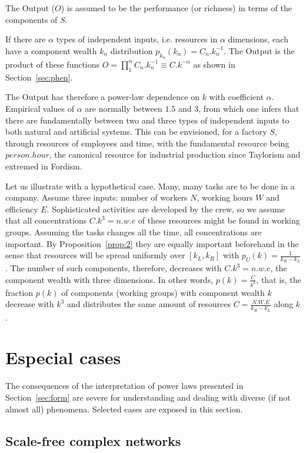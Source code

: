 \documentclass[a4paper, 11pt]{article} %
\begin{document}
The Output ($O$)
is assumed to be the performance (or richness) in terms of the components of $S$.

If there are $\alpha$ types of independent inputs, i.e. resources in $\alpha$ dimensions,
each have a component wealth $k_n$ distribution
$p_{k_n}(k_n)=C_n.k_n^{-1}$.
The Output is the product of these functions
$O = \prod_1^{\alpha} C_n.k_n^{-1}\equiv C.k^{-\alpha}$
as shown in Section~\ref{sec:phen}. 

The Output has therefore a power-law dependence on $k$ with coefficient $\alpha$. 
Empirical values of $\alpha$
are normally between $1.5$ and $3$,
from which one infers that there are 
fundamentally between two and three types
of independent inputs to both natural and artificial systems.
This can be envisioned, for a factory $S$, through resources
of employees and time, with the fundamental resource being 
$person . hour$, the canonical resource for 
industrial production since Taylorism
and extremed in Fordism.

Let us illustrate with a hypothetical case.
Many, many tasks are to be done in a company.
Assume three inputs:
number of workers $N$, working hours $W$
and efficiency $E$.
Sophisticated activities are developed by the crew,
so we assume that all concentrations $C.k^3=n.w.e$
of these resources might be found in working groups.
Assuming the tasks changes all the time,
all concentrations are important.
By Proposition~\ref{prop:2} they are equally important beforehand
in the sense that 
resources will be spread uniformly over $[k_L,k_R]$
with $p_U(k)=\frac{1}{k_R-k_L}$.
The number of such components, therefore,
decreases with $C.k^3=n.w.e$, the component wealth with three dimensions.
In other words,
$p(k)=\frac{C}{k^3}$, that is,
the fraction $p(k)$ of components (working groups) with component wealth $k$
decrease with $k^3$ and distributes the same
amount of resources $C=\frac{N.W.E}{k_R-k_L}$ along $k$.

\section{Especial cases}\label{sec:esp}
The consequences of the
interpretation of power laws presented in Section~\ref{sec:form}
are severe for understanding and dealing with
diverse (if not almost all)
phenomena. Selected cases are exposed in this section.


\subsection{Scale-free complex networks}
\end{document}
